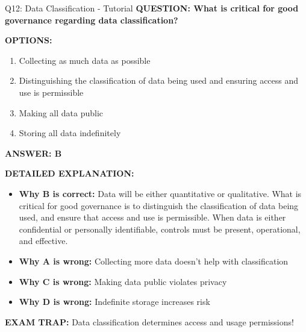 \documentclass[8pt]{beamer}
\begin{document}
	\begin{frame}{Q12: Data Classification - Tutorial}
		\fontsize{6.5}{7.5}\selectfont
		\textbf{QUESTION: What is critical for good governance regarding data classification?}
		
		\vspace{0.1cm}
		\textbf{OPTIONS:}
		\begin{enumerate}
			\item Collecting as much data as possible
			\item Distinguishing the classification of data being used and ensuring access and use is permissible
			\item Making all data public
			\item Storing all data indefinitely
		\end{enumerate}
		
		\vspace{0.1cm}
		\textcolor{myblue}{\textbf{ANSWER: B}}
		
		\vspace{0.1cm}
		\textbf{DETAILED EXPLANATION:}
		\begin{itemize}
			\item \textbf{Why B is correct:} Data will be either quantitative or qualitative. What is critical for good governance is to distinguish the classification of data being used, and ensure that access and use is permissible. When data is either confidential or personally identifiable, controls must be present, operational, and effective.
			\item \textbf{Why A is wrong:} Collecting more data doesn't help with classification
			\item \textbf{Why C is wrong:} Making data public violates privacy
			\item \textbf{Why D is wrong:} Indefinite storage increases risk
		\end{itemize}
		
		\textcolor{myred}{\textbf{EXAM TRAP:}} Data classification determines \textcolor{myblue}{access and usage permissions}!
	\end{frame}
	
\end{document}
